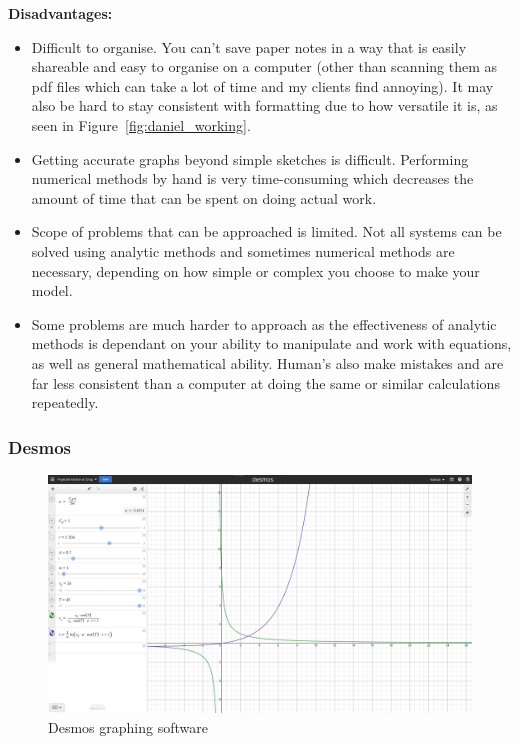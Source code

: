 \documentclass[11pt]{article}
\begin{document}
                \textbf{Disadvantages:}
                \begin{itemize}
                    \item Difficult to organise. You can't save paper notes in a way that is easily shareable and easy to organise on a computer (other than scanning them as pdf files which can take a lot of time and my clients find annoying). It may also be hard to stay consistent with formatting due to how versatile it is, as seen in Figure~\ref{fig:daniel_working}.
                    \item Getting accurate graphs beyond simple sketches is difficult. Performing numerical methods by hand is very time-consuming which decreases the amount of time that can be spent on doing actual work. 
                    \item Scope of problems that can be approached is limited. Not all systems can be solved using analytic methods and sometimes numerical methods are necessary, depending on how simple or complex you choose to make your model.
                    \item Some problems are much harder to approach as the effectiveness of analytic methods is dependant on your ability to manipulate and work with equations, as well as general mathematical ability. Human's also make mistakes and are far less consistent than a computer at doing the same or similar calculations repeatedly.
                \end{itemize}

            \subsubsection{Desmos}
                \begin{figure}[!ht]
                    \begin{center}
                        \includegraphics[width=.5\textwidth]{figures/desmos.png}
                    \end{center}
                    \caption{Desmos graphing software}
                    \label{fig:desmos}
                \end{figure}
\end{document}

